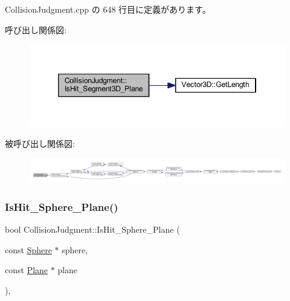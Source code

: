  Collision\+Judgment.\+cpp の 648 行目に定義があります。

呼び出し関係図\+:\nopagebreak
\begin{figure}[H]
\begin{center}
\leavevmode
\includegraphics[width=346pt]{class_collision_judgment_a0f5514dbfaa4dde5531cb6e5512502e5_cgraph}
\end{center}
\end{figure}
被呼び出し関係図\+:
\nopagebreak
\begin{figure}[H]
\begin{center}
\leavevmode
\includegraphics[width=350pt]{class_collision_judgment_a0f5514dbfaa4dde5531cb6e5512502e5_icgraph}
\end{center}
\end{figure}
\mbox{\label{class_collision_judgment_a7ec99cbf152e28907e2770ed44a7cefa}} 
\subsubsection{\texorpdfstring{Is\+Hit\+\_\+\+Sphere\+\_\+\+Plane()}{IsHit\_Sphere\_Plane()}}
{\footnotesize\ttfamily bool Collision\+Judgment\+::\+Is\+Hit\+\_\+\+Sphere\+\_\+\+Plane (\begin{DoxyParamCaption}\item[{const \mbox{\hyperlink{class_sphere}{Sphere}} $\ast$}]{sphere,  }\item[{const \mbox{\hyperlink{class_plane}{Plane}} $\ast$}]{plane }\end{DoxyParamCaption})\hspace{0.3cm}{\ttfamily [static]}, {\ttfamily [private]}}



